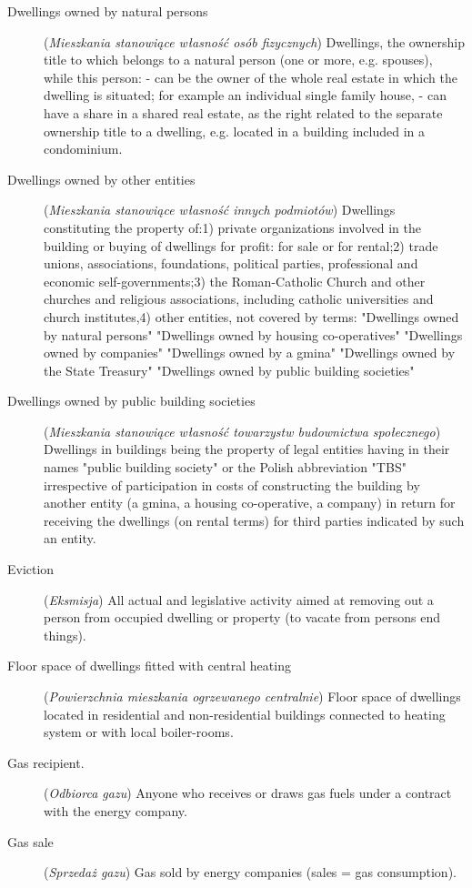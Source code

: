 \documentclass[12pt,a4paper]{article}
\begin{document}
\begin{description}
\item[Dwellings owned by natural persons] (\textit{Mieszkania stanowiące własność osób fizycznych}) Dwellings, the ownership title to which belongs to a natural person (one or more, e.g. spouses), while this person: - can be the owner of the whole real estate in which the dwelling is situated; for example an individual single family house, - can have a share in a shared real estate, as the right related to the separate ownership title to a dwelling, e.g. located in a building included in a condominium.
\item[Dwellings owned by other entities] (\textit{Mieszkania stanowiące własność innych podmiotów}) Dwellings constituting the property of:1) private organizations involved in the building or buying of dwellings for profit: for sale or for rental;2) trade unions, associations, foundations, political parties, professional and economic self-governments;3) the Roman-Catholic Church and other churches and religious associations, including catholic universities and church institutes,4) other entities, not covered by terms: "Dwellings owned by natural persons" "Dwellings owned by housing co-operatives" "Dwellings owned by companies" "Dwellings owned by a gmina" "Dwellings owned by the State Treasury" "Dwellings owned by public building societies"
\item[Dwellings owned by public building societies] (\textit{Mieszkania stanowiące własność towarzystw budownictwa społecznego}) Dwellings in buildings being the property of legal entities having in their names "public building society" or the Polish abbreviation "TBS" irrespective of participation in costs of constructing the building by another entity (a gmina, a housing co-operative, a company) in return for receiving the dwellings (on rental terms) for third parties indicated by such an entity.
\item[Eviction] (\textit{Eksmisja}) All actual and legislative activity aimed at removing out a person from occupied dwelling or property (to vacate from persons end things).
\item[Floor space of dwellings fitted with central heating] (\textit{Powierzchnia mieszkania ogrzewanego centralnie}) Floor space of dwellings located in residential and non-residential buildings connected to heating system or with local boiler-rooms.
\item[Gas recipient.] (\textit{Odbiorca gazu}) Anyone who receives or draws gas fuels under a contract with the energy company.
\item[Gas sale] (\textit{Sprzedaż gazu}) Gas sold by energy companies (sales = gas consumption).

\end{description}
\end{document}
